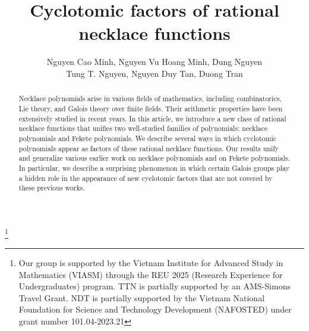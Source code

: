 \documentclass[12t,a4paper]{amsart}
\theoremstyle{definition}
\numberwithin{equation}{section}
\begin{document}
\title{Cyclotomic factors of rational necklace functions}
\author{Nguyen Cao Minh, Nguyen Vu Hoang Minh, Dung Nguyen \\ Tung T. Nguyen,  Nguyen Duy Tan, Duong Tran}

\address{Department of Mathematics and Informatics, Ho Chi Minh City University of Education, Ho Chi Minh City, Vietnam}

\address{Faculty of Mathematics and Computer Science, Ho Chi Minh City University of Science, Ho Chi Minh City, Vietnam}

 \address{Department of Mathematics, Elmhurst University, Elmhurst, Illinois, USA}

 \address{Department of Mathematics, Elmhurst University, Elmhurst, Illinois, USA}
 
  \address{Faculty of Mathematics and Informatics, Hanoi University of Science and Technology, 1 Dai Co Viet Road, Hanoi, Vietnam } 

\address{Michigan State University, USA}

\thanks{Our group is supported by the Vietnam Institute for Advanced Study in Mathematics (VIASM) through the REU 2025 (Research Experience for Undergraduates) program. TTN is partially supported by an AMS-Simons Travel Grant. NDT is partially supported by the Vietnam National
Foundation for Science and Technology Development (NAFOSTED) under grant number 101.04-2023.21}

\begin{abstract}
Necklace polynomials arise in various fields of mathematics, including combinatorics, Lie theory, and Galois theory over finite fields. Their arithmetic properties have been extensively studied in recent years. In this article, we introduce a new class of rational necklace functions that unifies two well-studied families of polynomials: necklace polynomials and Fekete polynomials. We describe several ways in which cyclotomic polynomials appear as factors of these rational necklace functions. Our results unify and generalize various earlier work  on necklace polynomials and on Fekete polynomials. In particular, we describe a surprising phenomenon in which certain Galois groups play a hidden role in the appearance of new cyclotomic factors that are not covered by these previous works. 


  
\end{abstract}
\end{document}
